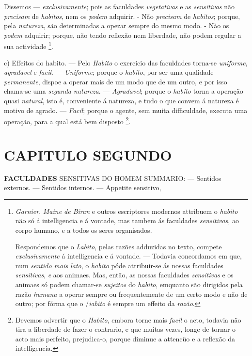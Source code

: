 Dissemos --- \emph{exclusivamente}; pois as faculdades \emph{vegetativas} e as \emph{sensitivas} não \emph{precisam} de \emph{habitos}, nem os \emph{podem} adquirir. - Não \emph{precisam} de \emph{habitos}; porque, pela \emph{natureza}, são determinadas a opezar sempre do mesmo modo. - Nào os \emph{podem} adquirir; porque, não tendo reflexão nem liberdade, não podem regular a sua actividade \footnote{\emph{Garnier}, \emph{Maine de Biran} e outros escriptores modernos attribuem o \emph{habito} não só á intelligencia e á vontade, mas tambem ás faculdades \emph{sensitivas}, ao corpo humano, e a todos os seres organisados.\par Respondemos que o \emph{Labito}, pelas razões adduzidas no texto, compete \emph{exclusivamente} á intelligencia e á vontade. --- Todavia concordamos em que, num \emph{sentido mais lato}, o \emph{habito} póde attribuir-se ás nossas faculdades \emph{sensitivas}, \emph{e} aos animaes. Mas, então, as nossas faculdades \emph{sensitivas} e os animaes só podem chamar-se \emph{sujeitos} do \emph{habito}, emquanto são dirigidos pela razão \emph{humana} a operar sempre ou frequentemente de um certo modo e não de outro; por fórma que o /\emph{iabito} é sempre um effeito da \emph{razão}.}.

c) Effeitos do habito. --- Pelo \emph{Habito} o exercicio das faculdades torna-se \emph{uniforme}, \emph{agradavel} e \emph{facil}. --- \emph{Uniforme}; porque o \emph{habito}, por ser uma qualidade \emph{permanente}, dispoe a operar mais de um modo que de um outro, e por isso chama-se uma \emph{segunda natureza}. --- \emph{Agradavel}; porque o \emph{habito} torna a operação quasi \emph{natural}, isto é, conveniente á natureza, e tudo o que convem á natureza é motivo de agrado. --- \emph{Facil}; porque o agente, sem muita difficuldade, executa uma operação, para a qual está bem disposto \footnote{Devemos advertir que o \emph{Habito}, embora torne mais \emph{facil} o acto, todavia não tira a liberdade de fazer o contrario, e que muitas vezes, longe de tornar o acto mais perfeito, prejudica-o, porque diminue a attencüo e a reflexão da intelligencia.}.


\chapter*{CAPITULO SEGUNDO}

 \textbf{FACULDADES} SENSITIVAS DO HOMEM \textsc{SUMMARIO}: --- Sentidos externos. --- Sentidos internos. --- Appetite sensitivo,

